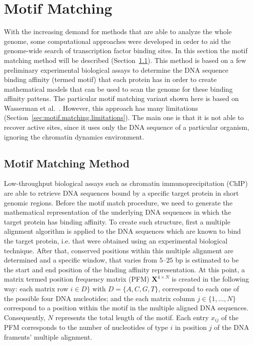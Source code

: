 \section{Motif Matching}
\label{sec:motif.matching}

With the increasing demand for methods that are able to analyze the whole genome, some computational approaches were developed in order to aid the genome-wide search of transcription factor binding sites. In this section the motif matching method will be described (Section~\ref{sec:motif.matching.method}). This method is based on a few preliminary experimental biological assays to determine the DNA sequence binding affinity (termed motif) that each protein has in order to create mathematical models that can be used to scan the genome for these binding affinity pattens. The particular motif matching variant shown here is based on Wasserman et al.~\cite{wasserman2004}. However, this approach has many limitations (Section~\ref{sec:motif.matching.limitations}). The main one is that it is not able to recover active sites, since it uses only the DNA sequence of a particular organism, ignoring the chromatin dynamics environment.

\subsection{Motif Matching Method}
\label{sec:motif.matching.method}

Low-throughput biological assays such as chromatin immunoprecipitation (ChIP) are able to retrieve DNA sequences bound by a specific target protein in short genomic regions. Before the motif match procedure, we need to generate the mathematical representation of the underlying DNA sequences in which the target protein has binding affinity. To create such structure, first a multiple alignment algorithm is applied to the DNA sequences which are known to bind the target protein, i.e. that were obtained using an experimental biological technique. After that, conserved positions within this multiple alignment are determined and a specific window, that varies from $5$--$25$ bp is estimated to be the start and end position of the binding affinity representation. At this point, a matrix termed position frequency matrix (PFM) $\mathbf{X}^{4 \times N}$ is created in the following way: each matrix row $i \in D\}$ with $D = \{A,C,G,T\}$, correspond to each one of the possible four DNA nucleotides; and the each matrix column $ j \in \{1, ..., N\} $ correspond to a position within the motif in the multiple aligned DNA sequences. Consequently, $N$ represents the total length of the motif. Each entry $x_{ij}$ of the PFM corresponds to the number of nucleotides of type $ i $ in position $ j $ of the DNA framents' multiple alignment.

